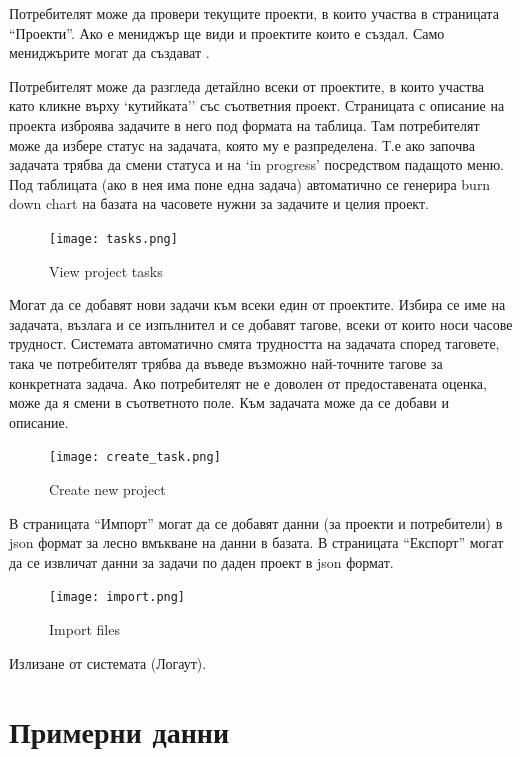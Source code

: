 \documentclass[12pt]{article}
\begin{document}
Потребителят може да провери текущите проекти, в които участва в страницата “Проекти”.
Ако е мениджър ще види и проектите които е създал. Само мениджърите могат да създават .

Потребителят може да разгледа детайлно всеки от проектите, в които участва като кликне върху ‘кутийката’’ със съответния проект. Страницата с описание на проекта изброява задачите в него под формата на таблица. Там потребителят може да избере статус на задачата, която му е разпределена. Т.е ако започва задачата трябва да смени статуса и на ‘in progress’ посредством падащото меню. Под таблицата (ако в нея има поне една задача) автоматично се генерира burn down chart на базата на часовете нужни за задачите и целия проект. 
\medskip


\begin{figure}[h!]
\centering
  \texttt{[image: tasks.png]}
  \caption{View project tasks}
\end{figure}


Могат да се добавят нови задачи към всеки един от проектите. 
Избира се име на задачата, възлага и се изпълнител и се добавят тагове, всеки от които носи часове трудност. Системата автоматично смята трудността на задачата според таговете, така че потребителят трябва да въведе възможно най-точните тагове за конкретната задача. Ако потребителят не е доволен от предоставената оценка, може да я смени в съответното поле. Към задачата може да се добави и описание.

\begin{figure}[h!]
\centering
  \texttt{[image: create\_task.png]}
  \caption{Create new project}
\end{figure}

\medskip

В страницата “Импорт” могат да се добавят данни (за проекти и потребители) в json формат за лесно вмъкване на данни в базата. В страницата “Експорт” могат да се извличат данни за задачи по даден проект в json формат.

\begin{figure}[h!]
\centering
  \texttt{[image: import.png]}
  \caption{Import files}
\end{figure}

\medskip

Излизане от системата (Логаут).
\newpage
\section{Примерни данни}
\end{document}
